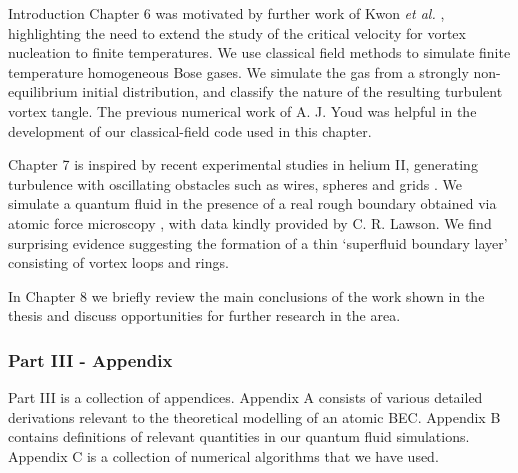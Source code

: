 \begin{chapter}{\label{cha:bose_gases}Introduction}
Chapter 6 was motivated by further work of Kwon {\it et al.} \cite{kwon_2015a}, highlighting the need to extend the study of the critical velocity for vortex nucleation to finite temperatures. We use classical field methods to simulate finite temperature homogeneous Bose gases. We simulate the gas from a strongly non-equilibrium initial distribution, and classify the nature of the resulting turbulent vortex tangle. The previous numerical work of A. J. Youd was helpful in the development of our classical-field code used in this chapter.

Chapter 7 is inspired by recent experimental studies in helium II, generating turbulence with oscillating obstacles such as wires, spheres and grids \cite{Davis2000,Guenault1986,Bradley2011,Fisher2001,Schoepe1995,Blaauwgeers2007,Bradley2012,Tabeling1998,Salort,VinenSkrbek2008}. We simulate a quantum fluid in the presence of a real rough boundary obtained via atomic force microscopy \cite{Lawson}, with data kindly provided by C. R. Lawson. We find surprising evidence suggesting the formation of a thin `superfluid boundary layer' consisting of vortex loops and rings.

In Chapter 8 we briefly review the main conclusions of the work shown in the thesis and discuss opportunities for further research in the area.

\subsubsection{Part III - Appendix}
Part III is a collection of appendices. Appendix A consists of various detailed derivations relevant to the theoretical modelling of an atomic BEC. Appendix B contains definitions of relevant quantities in our quantum fluid simulations. Appendix C is a collection of numerical algorithms that we have used.



\end{chapter}
